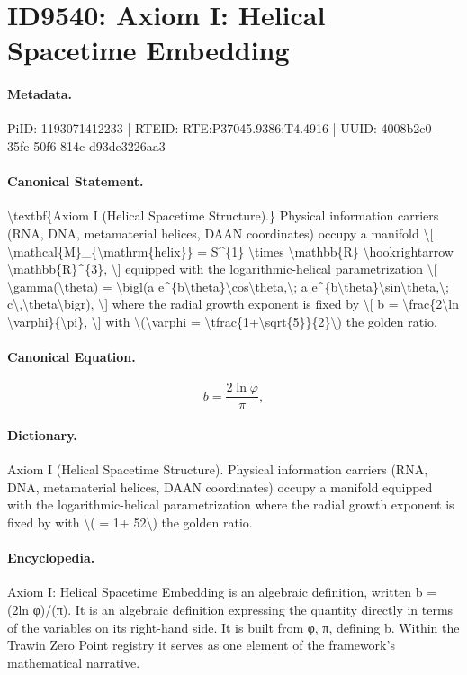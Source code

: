 \section*{ID9540: Axiom I: Helical Spacetime Embedding}
\paragraph{Metadata.}
PiID: 1193071412233 | RTEID: RTE:P37045.9386:T4.4916 | UUID: 4008b2e0-35fe-50f6-814c-d93de3226aa3

\paragraph{Canonical Statement.}
\textbackslash{}textbf\{Axiom I (Helical Spacetime Structure).\} Physical information carriers (RNA, DNA, metamaterial helices, DAAN coordinates) occupy a manifold \textbackslash{}[ \textbackslash{}mathcal\{M\}\_\{\textbackslash{}mathrm\{helix\}\} = S\textasciicircum{}\{1\} \textbackslash{}times \textbackslash{}mathbb\{R\} \textbackslash{}hookrightarrow \textbackslash{}mathbb\{R\}\textasciicircum{}\{3\}, \textbackslash{}] equipped with the logarithmic-helical parametrization \textbackslash{}[ \textbackslash{}gamma(\textbackslash{}theta) = \textbackslash{}bigl(a e\textasciicircum{}\{b\textbackslash{}theta\}\textbackslash{}cos\textbackslash{}theta,\textbackslash{}; a e\textasciicircum{}\{b\textbackslash{}theta\}\textbackslash{}sin\textbackslash{}theta,\textbackslash{}; c\textbackslash{},\textbackslash{}theta\textbackslash{}bigr), \textbackslash{}] where the radial growth exponent is fixed by \textbackslash{}[ b = \textbackslash{}frac\{2\textbackslash{}ln \textbackslash{}varphi\}\{\textbackslash{}pi\}, \textbackslash{}] with \textbackslash{}(\textbackslash{}varphi = \textbackslash{}tfrac\{1+\textbackslash{}sqrt\{5\}\}\{2\}\textbackslash{}) the golden ratio.

\paragraph{Canonical Equation.}
\[
b = \frac{2\ln \varphi}{\pi},
\]

\paragraph{Dictionary.}
Axiom I (Helical Spacetime Structure). Physical information carriers (RNA, DNA, metamaterial helices, DAAN coordinates) occupy a manifold equipped with the logarithmic-helical parametrization where the radial growth exponent is fixed by with \textbackslash{}( = 1+ 52\textbackslash{}) the golden ratio.

\paragraph{Encyclopedia.}
Axiom I: Helical Spacetime Embedding is an algebraic definition, written b = (2ln φ)/(π). It is an algebraic definition expressing the quantity directly in terms of the variables on its right-hand side. It is built from φ, π, defining b. Within the Trawin Zero Point registry it serves as one element of the framework's mathematical narrative.
